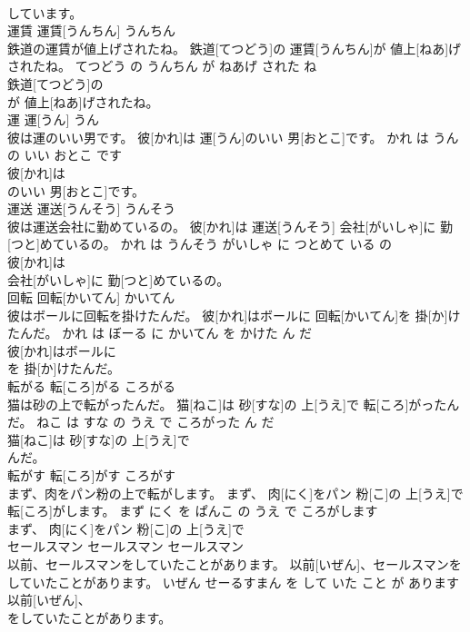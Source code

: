\documentclass[8pt]{extreport}
\begin{document}
\begin{CJK}{UTF8}{min}
\\	しています。			
\\	運賃	運賃[うんちん]	うんちん	
\\	鉄道の運賃が値上げされたね。	鉄道[てつどう]の 運賃[うんちん]が 値上[ねあ]げされたね。	てつどう の うんちん が ねあげ された ね	
\\	鉄道[てつどう]の
\\	が 値上[ねあ]げされたね。			
\\	運	運[うん]	うん	
\\	彼は運のいい男です。	彼[かれ]は 運[うん]のいい 男[おとこ]です。	かれ は うん の いい おとこ です	
\\	彼[かれ]は
\\	のいい 男[おとこ]です。			
\\	運送	運送[うんそう]	うんそう	
\\	彼は運送会社に勤めているの。	彼[かれ]は 運送[うんそう] 会社[がいしゃ]に 勤[つと]めているの。	かれ は うんそう がいしゃ に つとめて いる の	
\\	彼[かれ]は
\\	会社[がいしゃ]に 勤[つと]めているの。			
\\	回転	回転[かいてん]	かいてん	
\\	彼はボールに回転を掛けたんだ。	彼[かれ]はボールに 回転[かいてん]を 掛[か]けたんだ。	かれ は ぼーる に かいてん を かけた ん だ	
\\	彼[かれ]はボールに
\\	を 掛[か]けたんだ。			
\\	転がる	転[ころ]がる	ころがる	
\\	猫は砂の上で転がったんだ。	猫[ねこ]は 砂[すな]の 上[うえ]で 転[ころ]がったんだ。	ねこ は すな の うえ で ころがった ん だ	
\\	猫[ねこ]は 砂[すな]の 上[うえ]で
\\	んだ。			
\\	転がす	転[ころ]がす	ころがす	
\\	まず、肉をパン粉の上で転がします。	まず、 肉[にく]をパン 粉[こ]の 上[うえ]で 転[ころ]がします。	まず にく を ぱんこ の うえ で ころがします	
\\	まず、 肉[にく]をパン 粉[こ]の 上[うえ]で
\\	セールスマン	セールスマン	セールスマン	
\\	以前、セールスマンをしていたことがあります。	以前[いぜん]、セールスマンをしていたことがあります。	いぜん せーるすまん を して いた こと が あります	
\\	以前[いぜん]、
\\	をしていたことがあります。			

\end{CJK}
\end{document}

